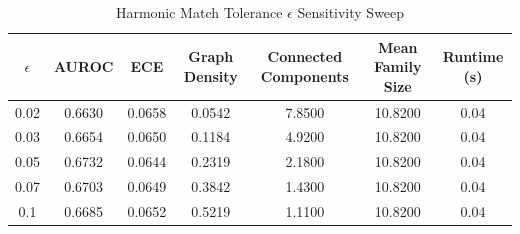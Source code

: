 \begin{table}[htbp]
\centering
\caption{Harmonic Match Tolerance $\epsilon$ Sensitivity Sweep}
\label{tab:epsilon_sensitivity}
\begin{tabular}{ccccccc}
\hline\hline
$\epsilon$ & AUROC & ECE & Graph Density & Connected Components & Mean Family Size & Runtime (s) \\
\hline
0.02 & 0.6630 & 0.0658 & 0.0542 & 7.8500 & 10.8200 & 0.04 \\
0.03 & 0.6654 & 0.0650 & 0.1184 & 4.9200 & 10.8200 & 0.04 \\
0.05 & 0.6732 & 0.0644 & 0.2319 & 2.1800 & 10.8200 & 0.04 \\
0.07 & 0.6703 & 0.0649 & 0.3842 & 1.4300 & 10.8200 & 0.04 \\
0.1 & 0.6685 & 0.0652 & 0.5219 & 1.1100 & 10.8200 & 0.04 \\
\hline
\end{tabular}
\end{table}
